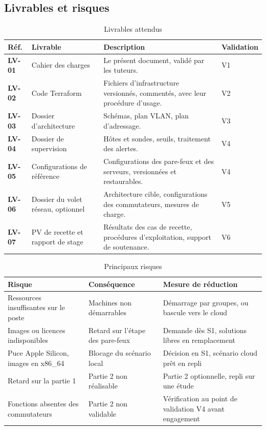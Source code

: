 \documentclass[11pt,a4paper]{article}
\newcommand{\rid}[1]{\textcolor{primary}{\textbf{\small #1}}}
\begin{document}
\subsection{Livrables et risques}
\begin{table}[H]
\centering
\caption{Livrables attendus}
\begin{tabularx}{\textwidth}{L{1.4cm} L{3.9cm} Y C{1.3cm}}
\toprule
{}\textbf{Réf.} & \textbf{Livrable} & \textbf{Description} & \textbf{Validation} \\
\midrule
\rid{LV-01} & Cahier des charges & Le présent document, validé par les tuteurs. & V1 \\
\rid{LV-02} & Code Terraform & Fichiers d'infrastructure versionnés, commentés, avec leur procédure d'usage. & V2 \\
\rid{LV-03} & Dossier d'architecture & Schémas, plan VLAN, plan d'adressage. & V3 \\
\rid{LV-04} & Dossier de supervision & Hôtes et sondes, seuils, traitement des alertes. & V4 \\
\rid{LV-05} & Configurations de référence & Configurations des pare-feux et des serveurs, versionnées et restaurables. & V4 \\
\rid{LV-06} & Dossier du volet réseau, optionnel & Architecture cible, configurations des commutateurs, mesures de charge. & V5 \\
\rid{LV-07} & PV de recette et rapport de stage & Résultats des cas de recette, procédures d'exploitation, support de soutenance. & V6 \\
\bottomrule
\end{tabularx}
\end{table}

\begin{table}[H]
\centering
\caption{Principaux risques}
\begin{tabularx}{\textwidth}{L{4.9cm} L{4.1cm} Y}
\toprule
{}\textbf{Risque} & \textbf{Conséquence} & \textbf{Mesure de réduction} \\
\midrule
Ressources insuffisantes sur le poste & Machines non démarrables & Démarrage par groupes, ou bascule vers le cloud \\
Images ou licences indisponibles & Retard sur l'étape des pare-feux & Demande dès S1, solutions libres en remplacement \\
Puce Apple Silicon, images en x86\_64 & Blocage du scénario local & Décision en S1, scénario cloud prêt en repli \\
Retard sur la partie 1 & Partie 2 non réalisable & Partie 2 optionnelle, repli sur une étude \\
Fonctions absentes des commutateurs & Partie 2 non validable & Vérification au point de validation V4 avant engagement \\
\bottomrule
\end{tabularx}
\end{table}
\end{document}

